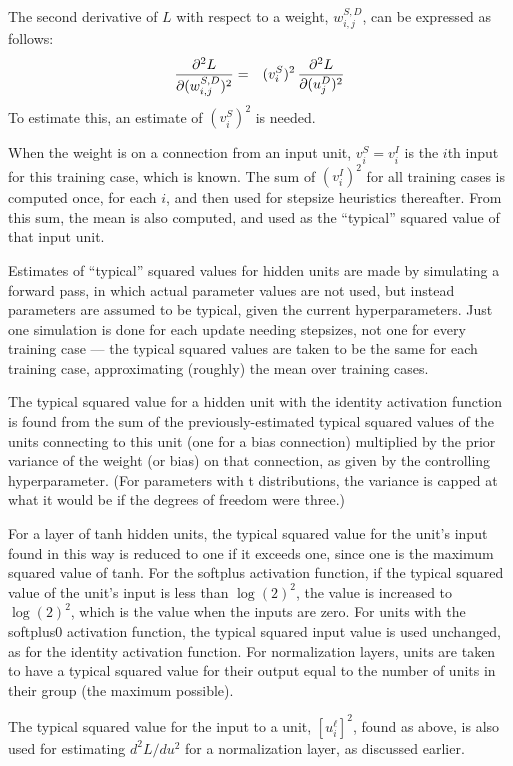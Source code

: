 \documentclass{report}[11pt]
\def\beq{\begin{eqnarray}}
\def\eeq{\end{eqnarray}}
\begin{document}
The second derivative of $L$ with respect to a weight, $w^{S,D}_{i,j}$,
can be expressed as follows:\beq
  {\partial^2 L \over \partial (w^{S,D}_{i,j})^2} & = &
    (v^S_i)^2\,{\partial^2 L \over \partial (u^D_j)^2}
\eeq%
To estimate this, an estimate of $(v^S_i)^2$ is needed.

When the weight is on a connection from an input unit, $v^S_i = v^I_i$
is the $i$th input for this training case, which is known.  The sum of
$(v^I_i)^2$ for all training cases is computed once, for each $i$, and
then used for stepsize heuristics thereafter.  From this sum, the
mean is also computed, and used as the ``typical'' squared value of
that input unit.

Estimates of ``typical'' squared values for hidden units are made by
simulating a forward pass, in which actual parameter values are not
used, but instead parameters are assumed to be typical, given the
current hyperparameters.  Just one simulation is done for each update
needing stepsizes, not one for every training case --- the typical
squared values are taken to be the same for each training case,
approximating (roughly) the mean over training cases.

The typical squared value for a hidden unit with the identity
activation function is found from the sum of the previously-estimated
typical squared values of the units connecting to this unit (one for a
bias connection) multiplied by the prior variance of the weight (or
bias) on that connection, as given by the controlling hyperparameter.
(For parameters with t distributions, the variance is capped at what
it would be if the degrees of freedom were three.)

For a layer of tanh hidden units, the typical squared value for the
unit's input found in this way is reduced to one if it exceeds one,
since one is the maximum squared value of tanh.  For the softplus
activation function, if the typical squared value of the unit's input
is less than $\log(2)^2$, the value is increased to $\log(2)^2$, which
is the value when the inputs are zero. For units with the softplus0
activation function, the typical squared input value is used
unchanged, as for the identity activation function.  For normalization
layers, units are taken to have a typical squared value for their
output equal to the number of units in their group (the maximum
possible).

The typical squared value for the input to a unit, $[u^{\ell}_i]^2$,
found as above, is also used for estimating $d^2L/du^2$ for a
normalization layer, as discussed earlier.
\end{document}
